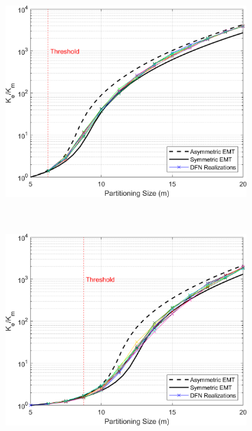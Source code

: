 \documentclass[Supplementary.tex]{subfiles}
\begin{document}
\begin{figure}[ht]
\begin{subfigure}{0.3\textwidth}
        \includegraphics[width=\textwidth]{FSU/Plot_FSU_Case_03_nohead.png}
        \label{fig:FSU_3}
    \end{subfigure}
    \\
    \begin{subfigure}{0.3\textwidth}
        \includegraphics[width=\textwidth]{FSU/Plot_FSU_Case_04_nohead.png}
        \label{fig:FSU_4}
    \end{subfigure}
    \begin{subfigure}{0.3\textwidth}

\end{subfigure}
\end{figure}
\end{document}

